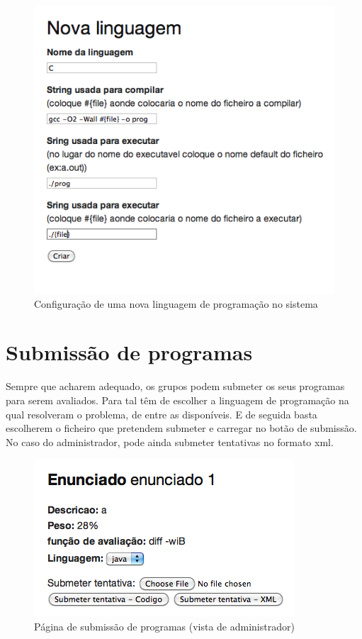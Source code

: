 \begin{itemize}
\begin{figure}[H]
\begin{center}
\includegraphics[scale=0.60]{Images/newLang}
\caption{Configuração de uma nova linguagem de programação no sistema}\label{img:newLang}
\end{center}
\end{figure} 

\end{itemize}

\section{Submissão de programas}\label{sec subm}
Sempre que acharem adequado, os grupos podem submeter os seus programas para serem avaliados. Para tal têm de escolher a linguagem de programação na qual resolveram o problema, de entre as disponíveis. E de seguida basta escolherem o ficheiro que pretendem submeter e carregar no botão de submissão.\\
No caso do administrador, pode ainda submeter tentativas no formato xml.

\begin{figure}[H]
\begin{center}
\includegraphics[scale=0.60]{Images/submissao}
\caption{Página de submissão de programas (vista de administrador)}\label{img:subm}
\end{center}
\end{figure} 

